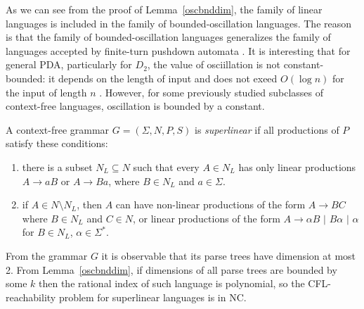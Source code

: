 As we can see from the proof of Lemma~\ref{oscbnddim}, the family of linear languages is included in the family of bounded-oscillation languages. The reason is that the family of bounded-oscillation languages generalizes the family of languages accepted by finite-turn pushdown automata \cite{BoundOsc}. It is interesting that for general PDA, particularly for $D_2$, the value of osciillation is not constant-bounded: it depends on the length of input and does not exeed $O(\log n)$ for the input of length $n$ \cite*{Gundermann, Wechsung}. However, for some previously studied subclasses of context-free languages,  oscillation is bounded by a constant.

\begin{example} A context-free grammar $G = (\Sigma, N, P, S)$ is \textit{superlinear} if all productions of $P$ satisfy these conditions:
\begin{enumerate}
\item there is a subset $N_L \subseteq N$ such that every $A \in N_L$ has only linear productions $A\rightarrow aB$ or $A\rightarrow Ba$, where $B \in N_L$ and $a \in \Sigma$.
\item if $A \in N \setminus N_L$, then $A$ can have non-linear productions of the form $A \rightarrow BC$ where $B\in N_L$ and $C \in N$, or linear productions of the form $A\rightarrow \alpha B$ $\vert$ $B \alpha$ $\vert$ $\alpha$ for $B \in N_L$, $\alpha \in \Sigma^*$.
\end{enumerate}
From the grammar $G$ it is observable that its parse trees have dimension at most 2. From 
Lemma~\ref{oscbnddim}, if dimensions of all parse trees are bounded by some $k$ then the rational index of such language is polynomial, so the CFL-reachability problem for superlinear languages is in NC. 
\end{example}